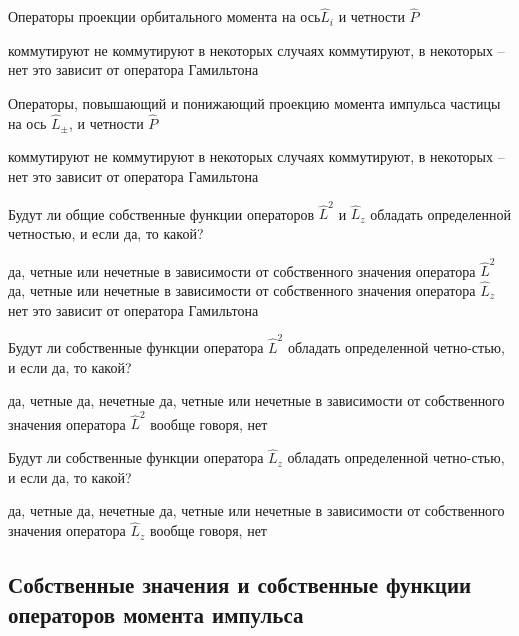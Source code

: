 \documentclass[11pt,a4paper]{exam}
\begin{document}
\begin{questions}
\question Операторы проекции орбитального момента на ось${\hat L_i}$ и четности $\hat P$ 
\begin{choices}
\choice коммутируют
\choice не коммутируют
\choice в некоторых случаях коммутируют, в некоторых – нет
\choice это зависит от оператора Гамильтона
\end{choices}

\question Операторы, повышающий и понижающий проекцию момента импульса частицы на ось ${\hat L_ \pm }$, и четности $\hat P$ 
\begin{choices}
\choice коммутируют
\choice не коммутируют
\choice в некоторых случаях коммутируют, в некоторых – нет
\choice это зависит от оператора Гамильтона
\end{choices}

\question Будут ли общие собственные функции операторов ${\hat L^2}$ и ${\hat L_z}$ обладать определенной четностью, и если да, то какой? 
\begin{choices}
\choice да, четные или нечетные в зависимости от собственного значения оператора ${\hat L^2}$  
\choice да, четные или нечетные в зависимости от собственного значения оператора ${\hat L_z}$
\choice нет
\choice это зависит от оператора Гамильтона
\end{choices}

\question Будут ли собственные функции оператора ${\hat L^2}$ обладать определенной четно-стью, и если да, то какой? 
\begin{choices}
\choice да, четные
\choice да, нечетные
\choice да, четные или нечетные в зависимости от собственного значения оператора ${\hat L^2}$
\choice вообще говоря, нет
\end{choices}

\question Будут ли собственные функции оператора ${\hat L_z}$ обладать определенной четно-стью, и если да, то какой? 
\begin{choices}
\choice да, четные
\choice да, нечетные
\choice да, четные или нечетные в зависимости от собственного значения оператора ${\hat L_z}$
\choice вообще говоря, нет 
\end{choices}

\end{questions}





\subsection{ Собственные значения и собственные функции операторов момента импульса }
\end{document}
